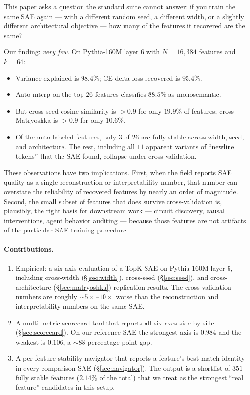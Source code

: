 \documentclass[11pt]{article}
\begin{document}
This paper asks a question the standard suite cannot answer: if you train
the same SAE again --- with a different random seed, a different width,
or a slightly different architectural objective --- how many of the
features it recovered are the same?

Our finding: \emph{very few}. On Pythia-160M layer 6 with $N=16{,}384$
features and $k=64$:
\begin{itemize}
\item Variance explained is $98.4\%$; CE-delta loss recovered is $95.4\%$.
\item Auto-interp on the top $26$ features classifies $88.5\%$ as
monosemantic.
\item But cross-seed cosine similarity is $> 0.9$ for only $19.9\%$ of
features; cross-Matryoshka is $> 0.9$ for only $10.6\%$.
\item Of the auto-labeled features, only $3$ of $26$ are fully stable
across width, seed, and architecture. The rest, including all
$11$ apparent variants of ``newline tokens'' that the SAE found, collapse
under cross-validation.
\end{itemize}

These observations have two implications. First, when the field reports
SAE quality as a single reconstruction or interpretability number, that
number can overstate the reliability of recovered features by nearly an
order of magnitude. Second, the small subset of features that does
survive cross-validation is, plausibly, the right basis for downstream
work --- circuit discovery, causal interventions, agent behavior auditing
--- because those features are not artifacts of the particular SAE
training procedure.

\paragraph{Contributions.}
\begin{enumerate}
\item Empirical: a six-axis evaluation of a TopK SAE on Pythia-160M layer
6, including cross-width (\S\ref{sec:width}), cross-seed
(\S\ref{sec:seed}), and cross-architecture (\S\ref{sec:matryoshka})
replication results. The cross-validation numbers are roughly
$\sim 5\times$--$10\times$ worse than the reconstruction and
interpretability numbers on the same SAE.
\item A multi-metric scorecard tool that reports all six axes side-by-side
(\S\ref{sec:scorecard}). On our reference SAE the strongest axis is
$0.984$ and the weakest is $0.106$, a $\sim 88$ percentage-point gap.
\item A per-feature stability navigator that reports a feature's
best-match identity in every comparison SAE
(\S\ref{sec:navigator}). The output is a shortlist of $351$ fully stable
features ($2.14\%$ of the total) that we treat as the strongest ``real
feature'' candidates in this setup.
\end{enumerate}
\end{document}
